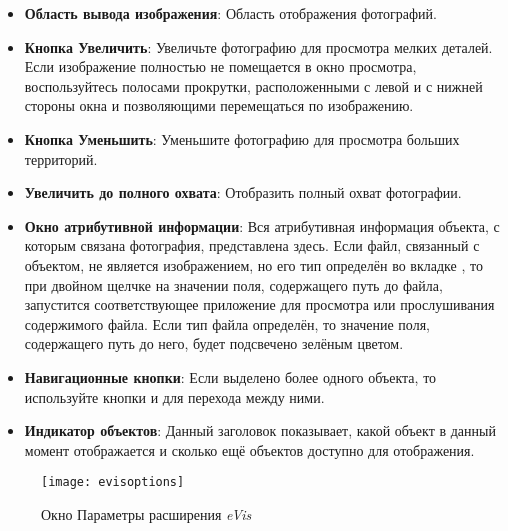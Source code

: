 \begin{itemize}[label=--]
\item \textbf{Область вывода изображения}: Область отображения фотографий.
\item \textbf{Кнопка Увеличить}: Увеличьте фотографию для просмотра мелких
деталей. Если изображение полностью не помещается в окно просмотра,
воспользуйтесь полосами прокрутки, расположенными с левой и с нижней
стороны окна и позволяющими перемещаться по изображению.
\item \textbf{Кнопка Уменьшить}: Уменьшите фотографию для просмотра больших
территорий.
\item \textbf{Увеличить до полного охвата}: Отобразить полный охват
фотографии.
\item \textbf{Окно атрибутивной информации}: Вся атрибутивная информация
объекта, с которым связана фотография, представлена здесь. Если
файл, связанный с объектом, не является изображением, но его тип определён во
вкладке , то при двойном щелчке на значении поля,
содержащего путь до файла, запустится соответствующее приложение
для просмотра или прослушивания содержимого файла. Если тип файла определён,
то значение поля, содержащего путь до него, будет подсвечено зелёным цветом.
\item \textbf{Навигационные кнопки}: Если выделено более одного
объекта, то используйте кнопки  и 
для перехода между ними.
\item \textbf{Индикатор объектов}: Данный заголовок показывает, какой объект
в данный момент отображается и сколько ещё объектов доступно для отображения.
\end{itemize}

\label{evis_options_window}

\begin{figure}[ht]
   \centering
   \texttt{[image: evisoptions]}
   \caption{Окно Параметры расширения \emph{eVis} \wincaption}\label{evisoptions}
\end{figure}


